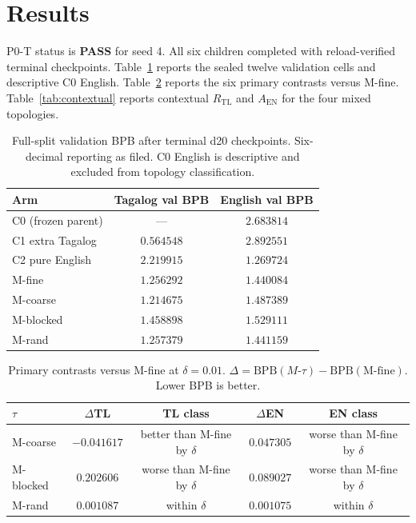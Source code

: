 \documentclass[11pt,a4paper]{article}
\begin{document}
\section{Results}
\label{sec:results}

P0-T status is \textbf{PASS} for seed 4. All six children completed with reload-verified terminal checkpoints. Table~\ref{tab:cells} reports the sealed twelve validation cells and descriptive C0 English. Table~\ref{tab:primary} reports the six primary contrasts versus M-fine. Table~\ref{tab:contextual} reports contextual $R_{\mathrm{TL}}$ and $A_{\mathrm{EN}}$ for the four mixed topologies.

\begin{table}[ht]
\centering
\caption{Full-split validation BPB after terminal d20 checkpoints. Six-decimal reporting as filed. C0 English is descriptive and excluded from topology classification.}
\label{tab:cells}
\begin{tabular}{lcc}
\toprule
Arm & Tagalog val BPB & English val BPB \\
\midrule
C0 (frozen parent) & --- & $2.683814$ \\
C1 extra Tagalog & $0.564548$ & $2.892551$ \\
C2 pure English & $2.219915$ & $1.269724$ \\
M-fine & $1.256292$ & $1.440084$ \\
M-coarse & $1.214675$ & $1.487389$ \\
M-blocked & $1.458898$ & $1.529111$ \\
M-rand & $1.257379$ & $1.441159$ \\
\bottomrule
\end{tabular}
\end{table}

\begin{table}[ht]
\centering
\caption{Primary contrasts versus M-fine at $\delta=0.01$. $\Delta=\mathrm{BPB}(M\textrm{-}\tau)-\mathrm{BPB}(\textrm{M-fine})$. Lower BPB is better.}
\label{tab:primary}
\begin{tabular}{lcccc}
\toprule
$\tau$ & $\Delta$TL & TL class & $\Delta$EN & EN class \\
\midrule
M-coarse & $-0.041617$ & better than M-fine by $\delta$ & $0.047305$ & worse than M-fine by $\delta$ \\
M-blocked & $0.202606$ & worse than M-fine by $\delta$ & $0.089027$ & worse than M-fine by $\delta$ \\
M-rand & $0.001087$ & within $\delta$ & $0.001075$ & within $\delta$ \\
\bottomrule
\end{tabular}
\end{table}
\end{document}
